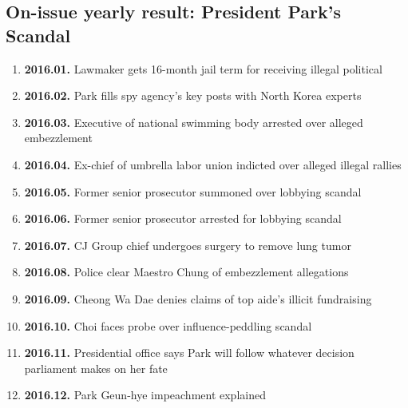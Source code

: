 \subsection{On-issue yearly result: President Park's Scandal}
\begin{enumerate}
  \item \textbf{2016.01.} Lawmaker gets 16-month jail term for receiving illegal political
  \item \textbf{2016.02.} Park fills spy agency's key posts with North Korea experts
  \item \textbf{2016.03.} Executive of national swimming body arrested over alleged embezzlement
  \item \textbf{2016.04.} Ex-chief of umbrella labor union indicted over alleged illegal rallies
  \item \textbf{2016.05.} Former senior prosecutor summoned over lobbying scandal
  \item \textbf{2016.06.} Former senior prosecutor arrested for lobbying scandal
  \item \textbf{2016.07.} CJ Group chief undergoes surgery to remove lung tumor
  \item \textbf{2016.08.} Police clear Maestro Chung of embezzlement allegations
  \item \textbf{2016.09.} Cheong Wa Dae denies claims of top aide's illicit fundraising
  \item \textbf{2016.10.} Choi faces probe over influence-peddling scandal
  \item \textbf{2016.11.} Presidential office says Park will follow whatever decision parliament makes on her fate
  \item \textbf{2016.12.} Park Geun-hye impeachment explained
\end{enumerate}

